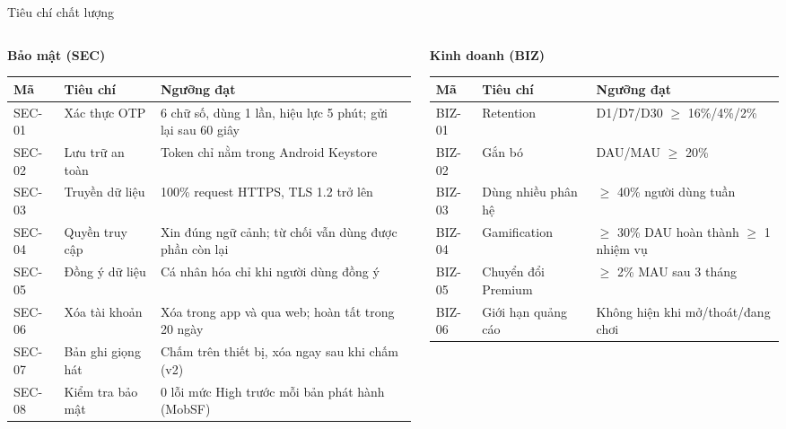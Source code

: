 \begin{frame}{Tiêu chí chất lượng}
\begin{columns}[T]
\begin{column}{0.52\textwidth}
\centering
{\scriptsize\bfseries Bảo mật (SEC)}\\[1mm]
{\tiny\setlength{\tabcolsep}{3pt}
\begin{tabular}{@{}p{0.9cm}p{2.0cm}p{3.5cm}@{}}
\toprule
\textbf{Mã} & \textbf{Tiêu chí} & \textbf{Ngưỡng đạt} \\
\midrule
SEC-01 & Xác thực OTP & 6 chữ số, dùng 1 lần, hiệu lực 5 phút; gửi lại sau 60 giây \\
SEC-02 & Lưu trữ an toàn & Token chỉ nằm trong Android Keystore \\
SEC-03 & Truyền dữ liệu & 100\% request HTTPS, TLS 1.2 trở lên \\
SEC-04 & Quyền truy cập & Xin đúng ngữ cảnh; từ chối vẫn dùng được phần còn lại \\
SEC-05 & Đồng ý dữ liệu & Cá nhân hóa chỉ khi người dùng đồng ý \\
SEC-06 & Xóa tài khoản & Xóa trong app và qua web; hoàn tất trong 20 ngày \\
SEC-07 & Bản ghi giọng hát & Chấm trên thiết bị, xóa ngay sau khi chấm (v2) \\
SEC-08 & Kiểm tra bảo mật & 0 lỗi mức High trước mỗi bản phát hành (MobSF) \\
\bottomrule
\end{tabular}}
\end{column}
\begin{column}{0.46\textwidth}
\centering
{\scriptsize\bfseries Kinh doanh (BIZ)}\\[1mm]
{\tiny\setlength{\tabcolsep}{3pt}
\begin{tabular}{@{}p{0.9cm}p{2.0cm}p{3.0cm}@{}}
\toprule
\textbf{Mã} & \textbf{Tiêu chí} & \textbf{Ngưỡng đạt} \\
\midrule
BIZ-01 & Retention & D1/D7/D30 $\geq$ 16\%/4\%/2\% \\
BIZ-02 & Gắn bó & DAU/MAU $\geq$ 20\% \\
BIZ-03 & Dùng nhiều phân hệ & $\geq$ 40\% người dùng tuần \\
BIZ-04 & Gamification & $\geq$ 30\% DAU hoàn thành $\geq$ 1 nhiệm vụ \\
BIZ-05 & Chuyển đổi Premium & $\geq$ 2\% MAU sau 3 tháng \\
BIZ-06 & Giới hạn quảng cáo & Không hiện khi mở/thoát/đang chơi \\
\bottomrule
\end{tabular}}
\end{column}
\end{columns}
\end{frame}

